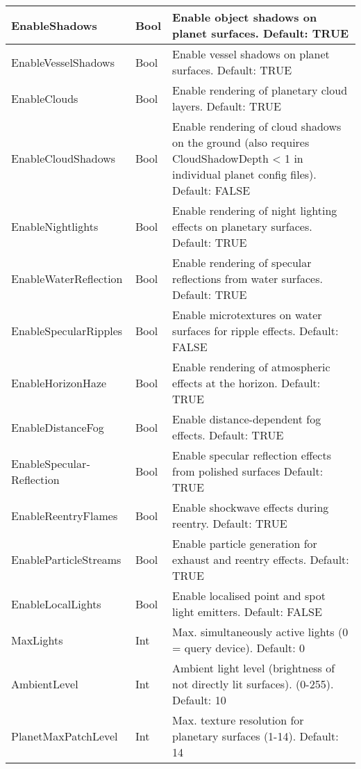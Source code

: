 \documentclass[Orbiter User Manual.tex]{subfiles}
\begin{document}
\begin{longtable}{ |p{}|p{}|p{}| }
	\hline\rule{0pt}{2ex}
	EnableShadows & Bool & Enable object shadows on planet surfaces. Default: TRUE\\
	\hline\rule{0pt}{2ex}
	EnableVesselShadows & Bool & Enable vessel shadows on planet surfaces. Default: TRUE\\
	\hline\rule{0pt}{2ex}
	EnableClouds & Bool & Enable rendering of planetary cloud layers. Default: TRUE\\
	\hline\rule{0pt}{2ex}
	EnableCloudShadows & Bool & Enable rendering of cloud shadows on the ground (also requires CloudShadowDepth < 1 in individual planet config files). Default: FALSE\\
	\hline\rule{0pt}{2ex}
	EnableNightlights & Bool & Enable rendering of night lighting effects on planetary surfaces. Default: TRUE\\
	\hline\rule{0pt}{2ex}
	EnableWaterReflection & Bool & Enable rendering of specular reflections from water surfaces. Default: TRUE\\
	\hline\rule{0pt}{2ex}
	EnableSpecularRipples & Bool & Enable microtextures on water surfaces for ripple effects. Default: FALSE\\
	\hline\rule{0pt}{2ex}
	EnableHorizonHaze & Bool & Enable rendering of atmospheric effects at the horizon. Default: TRUE\\
	\hline\rule{0pt}{2ex}
	EnableDistanceFog & Bool & Enable distance-dependent fog effects. Default: TRUE\\
	\hline\rule{0pt}{2ex}
	EnableSpecular­Reflection & Bool & Enable specular reflection effects from polished surfaces Default: TRUE\\
	\hline\rule{0pt}{2ex}
	EnableReentryFlames & Bool & Enable shockwave effects during reentry. Default: TRUE\\
	\hline\rule{0pt}{2ex}
	EnableParticleStreams & Bool & Enable particle generation for exhaust and reentry effects. Default: TRUE\\
	\hline\rule{0pt}{2ex}
	EnableLocalLights & Bool & Enable localised point and spot light emitters. Default: FALSE\\
	\hline\rule{0pt}{2ex}
	MaxLights & Int & Max. simultaneously active lights (0 = query device). Default: 0\\
	\hline\rule{0pt}{2ex}
	AmbientLevel & Int & Ambient light level (brightness of not directly lit surfaces). (0-255). Default: 10\\
	\hline\rule{0pt}{2ex}
	PlanetMaxPatchLevel & Int & Max. texture resolution for planetary surfaces (1-14). Default: 14\\

\end{longtable}
\end{document}
